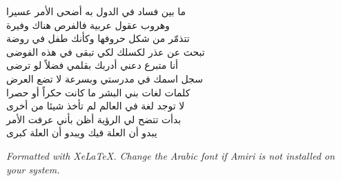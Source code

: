 \documentclass[a4paper,12pt]{article}
\begin{document}
\begin{tcolorbox}[colback=boxcolor,colframe=headercolor,title=\textbf{Stanza 3},breakable]
{ما بين فساد في الدول به أضحى الأمر عسيرا \\
وهروب عقول عربية فالفرص هناك وفيرة \\
تتذمّر من شكل حروفها وكأنك طفل في روضة \\
تبحث عن عذر لكسلك لكي تبقى في هذه الفوضى \\
أنا متبرع دعني أدربك بقلمي فضلاً لو ترضى \\
سجل اسمك في مدرستي وبسرعة لا تضع العرض \\
كلمات لغات بني البشر ما كانت حكراً أو حصرا \\
لا توجد لغة في العالم لم تأخذ شيئا من أخرى \\
بدأت تتضح لي الرؤية أظن بأني عرفت الأمر \\
يبدو أن العلة فيك ويبدو أن العلة كبرى \\
}
\end{tcolorbox}

\vspace{12pt}
{\small\textit{Formatted with XeLaTeX. Change the Arabic font if Amiri is not installed on your system.}}
\end{document}
